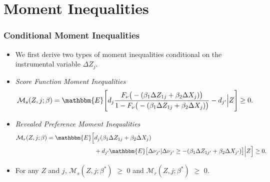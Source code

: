 \documentclass[10pt,letterpaper]{beamer}
\begin{document}

\section{Moment Inequalities}


\begin{frame}
\frametitle{Conditional Moment Inequalities}

\begin{itemize}
\item We first derive two types of moment inequalities conditional on the
instrumental variable $\Delta Z_{j}$. 

\item \textit{Score Function Moment Inequalities}  
\begin{align*}
\mathcal{M}_{s}(Z,j;\beta)=\mathbbm{E}\Bigg[d_{j}\frac{F_{\nu}\big(%
-(\beta_{1}\Delta Z_{1j}+\beta_{2}\Delta X_{j})\big)}{1-F_{\nu}\big(%
-(\beta_{1}\Delta Z_{1j}+\beta_{2}\Delta X_{j})\big)}-d_{j^{\prime }}\Big|Z%
\Bigg]\geq 0.
\end{align*}

\item \textit{Revealed Preference Moment Inequalities}  
\begin{align*}
\mathcal{M}_{r}(Z,j;\beta)=\mathbbm{E}\Big[&d_{j}(\beta_{1}\Delta
Z_{1j}+\beta_{2}\Delta X_{j})  \notag \\
&+d_{j^{\prime }}\mathbbm{E}\big[\Delta\nu_{j^{\prime
}}|\Delta\nu_{j^{\prime }}\geq-(\beta_{1}\Delta Z_{1j^{\prime
}}+\beta_{2}\Delta X_{j^{\prime }})\big]\Big|Z\Big]\geq 0.
\end{align*}

\item For any $Z$ and $j$, $\mathcal{M}_{s}(Z,j;\beta^{*})$ $\geq$ $0$ and $%
\mathcal{M}_{r}(Z,j;\beta^{*})$ $\geq$ $0$.
\end{itemize}
\end{frame}

\end{document}
